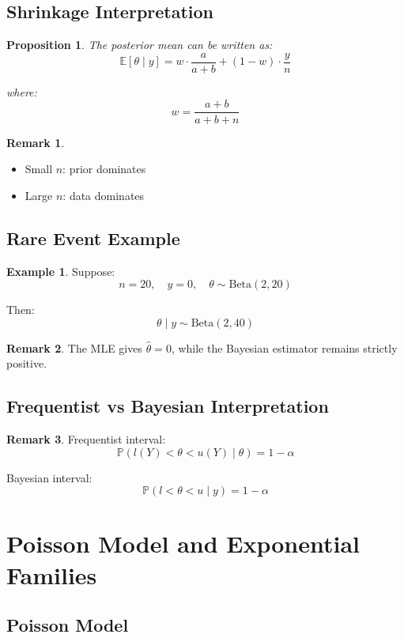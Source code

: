 \documentclass[12pt,oneside]{book}
\numberwithin{equation}{section}
\theoremstyle{definition}
\newtheorem{example}{Example}[section]
\newtheorem{remark}{Remark}[section]
\theoremstyle{plain}
\newtheorem{proposition}{Proposition}[section]
\theoremstyle{remark}
\newcommand{\E}{\mathbb{E}}
\newcommand{\Prob}{\mathbb{P}}
\newcommand{\BetaDist}{\mathrm{Beta}}
\begin{document}
\section{Shrinkage Interpretation}

\begin{proposition}
The posterior mean can be written as:
$$
\E[\theta \mid y]
=
w \cdot \frac{a}{a+b}
+
(1-w)\cdot \frac{y}{n}
$$

where:
$$
w = \frac{a+b}{a+b+n}
$$
\end{proposition}

\begin{remark}
\begin{itemize}
\item Small $n$: prior dominates
\item Large $n$: data dominates
\end{itemize}
\end{remark}

\section{Rare Event Example}

\begin{example}
Suppose:
$$
n=20, \quad y=0, \quad \theta \sim \BetaDist(2,20)
$$

Then:
$$
\theta \mid y \sim \BetaDist(2,40)
$$
\end{example}

\begin{remark}
The MLE gives $\hat{\theta}=0$, while the Bayesian estimator remains strictly positive.
\end{remark}

\section{Frequentist vs Bayesian Interpretation}

\begin{remark}
Frequentist interval:
$$
\Prob(l(Y) < \theta < u(Y) \mid \theta) = 1-\alpha
$$

Bayesian interval:
$$
\Prob(l < \theta < u \mid y) = 1-\alpha
$$
\end{remark}

\chapter{Poisson Model and Exponential Families}

\section{Poisson Model}
\end{document}
